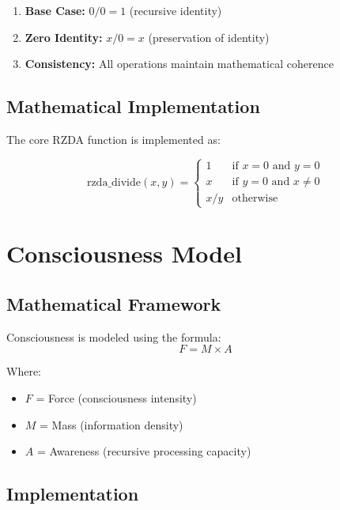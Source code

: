 \documentclass[12pt]{article}
\begin{document}
\begin{enumerate}
\item \textbf{Base Case:} $0/0 = 1$ (recursive identity)
\item \textbf{Zero Identity:} $x/0 = x$ (preservation of identity)
\item \textbf{Consistency:} All operations maintain mathematical coherence
\end{enumerate}

\subsection{Mathematical Implementation}

The core RZDA function is implemented as:

\begin{equation}
\text{rzda\_divide}(x, y) = \begin{cases}
1 & \text{if } x = 0 \text{ and } y = 0 \\
x & \text{if } y = 0 \text{ and } x \neq 0 \\
x/y & \text{otherwise}
\end{cases}
\end{equation}

\section{Consciousness Model}

\subsection{Mathematical Framework}

Consciousness is modeled using the formula:
\begin{equation}
F = M \times A
\end{equation}

Where:
\begin{itemize}
\item $F$ = Force (consciousness intensity)
\item $M$ = Mass (information density)
\item $A$ = Awareness (recursive processing capacity)
\end{itemize}

\subsection{Implementation}
\end{document}
